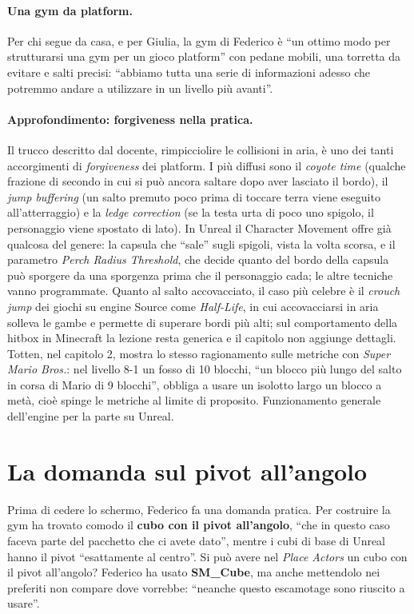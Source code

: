 \paragraph{Una gym da platform.} Per chi segue da casa, e per Giulia, la gym di Federico è
``un ottimo modo per strutturarsi una gym per un gioco platform'' con pedane mobili, una
torretta da evitare e salti precisi: ``abbiamo tutta una serie di informazioni adesso che
potremmo andare a utilizzare in un livello più avanti''.

\paragraph{Approfondimento: forgiveness nella pratica.} Il trucco descritto dal docente,
rimpicciolire le collisioni in aria, è uno dei tanti accorgimenti di \emph{forgiveness} dei
platform. I più diffusi sono il \emph{coyote time} (qualche frazione di secondo in cui si
può ancora saltare dopo aver lasciato il bordo), il \emph{jump buffering} (un salto premuto
poco prima di toccare terra viene eseguito all'atterraggio) e la \emph{ledge correction}
(se la testa urta di poco uno spigolo, il personaggio viene spostato di lato). In Unreal il
Character Movement offre già qualcosa del genere: la capsula che ``sale'' sugli spigoli,
vista la volta scorsa, e il parametro \emph{Perch Radius Threshold}, che decide quanto del
bordo della capsula può sporgere da una sporgenza prima che il personaggio cada; le altre
tecniche vanno programmate. Quanto al salto accovacciato, il caso più celebre è il
\emph{crouch jump} dei giochi su engine Source come \emph{Half-Life}, in cui accovacciarsi
in aria solleva le gambe e permette di superare bordi più alti; sul comportamento della
hitbox in Minecraft la lezione resta generica e il capitolo non aggiunge dettagli.
Totten, nel capitolo 2, mostra lo stesso ragionamento sulle metriche con
\emph{Super Mario Bros.}: nel livello 8-1 un fosso di 10 blocchi, ``un blocco più lungo
del salto in corsa di Mario di 9 blocchi'', obbliga a usare un isolotto largo un blocco a
metà, cioè spinge le metriche al limite di proposito. Funzionamento generale dell'engine
per la parte su Unreal.

\section{La domanda sul pivot all'angolo}
\label{ue14:sec:pivot}

Prima di cedere lo schermo, Federico fa una domanda pratica. Per costruire la gym ha
trovato comodo il \textbf{cubo con il pivot all'angolo}, ``che in questo caso faceva parte
del pacchetto che ci avete dato'', mentre i cubi di base di Unreal hanno il pivot ``esattamente
al centro''. Si può avere nel \emph{Place Actors} un cubo con il pivot all'angolo? Federico
ha usato \textbf{SM\_Cube}, ma anche mettendolo nei preferiti non compare dove vorrebbe:
``neanche questo escamotage sono riuscito a usare''.

